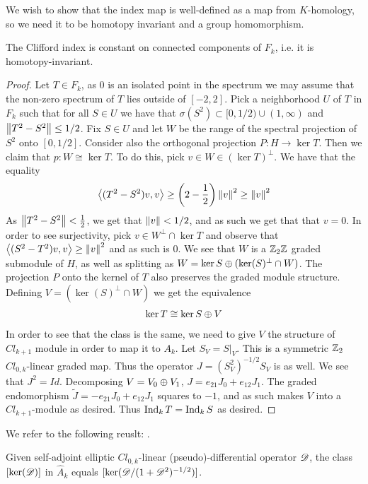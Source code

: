 We wish to show that the index map is well-defined as a map from $K$-homology, so we need it to be homotopy invariant and a group homomorphism. 
\begin{theorem}\label{welldef}
	The Clifford index is constant on connected components of $F_k$, i.e. it is homotopy-invariant. 
\end{theorem}
\begin{proof}
	Let $T\in F_k$, as $0$ is an isolated point in the spectrum we may assume that the non-zero spectrum of $T$ lies outside of $[-2,2]$. Pick a neighborhood $U$ of $T$ in $F_k$ such that for all $S\in U$ we have that $\sigma(S^2)\subset [0,1/2)\cup (1,\infty)$ and $\left \Vert T^2-S^2 \right \Vert\leq 1/2$. Fix $S\in U$ and let $W$ be the range of the spectral projection of $S^2$ onto $[0,1/2]$. 
	Consider also the orthogonal projection $P:H\to \ker T$. Then we claim that $p:W\cong \ker T$. To do this, pick $v\in W\in (\ker T)^\perp$. We have that the equality 
	\begin{align*}
		\left \langle (T^2-S^2)v,v \right \rangle\geq \left ( 2-\frac{1}{2} \right )\left \Vert v \right \Vert^2\geq \left \Vert v \right \Vert^2
	\end{align*}
	As $\left \Vert T^2-S^2 \right \Vert<\frac{1}{2}$, we get that $\left \Vert v \right \Vert<1/2$, and as such we get that that $v=0$. In order to see surjectivity, pick $v\in W^\perp \cap \ker T$ and observe that $\left \langle (S^2-T^2)v,v \right \rangle\geq \left \Vert v \right \Vert^2$ and as such is 0. 
	We see that $W$ is a $\mathbb{Z}_2\mathbb{Z}$ graded submodule of $H$, as well as splitting as $W=\ker S\oplus (\ker (S)^\perp \cap W)$. The projection $P$ onto the kernel of $T$ also preserves the graded module structure. Defining $V=(\ker (S)^\perp \cap W)$ we get the equivalence
	\begin{align*}
		\ker T\cong \ker S\oplus V
	\end{align*}
	In order to see that the class is the same, we need to give $V$ the structure of $Cl_{k+1}$ module in order to map it to $A_k$.
	Let $S_V=S|_V$. This is a symmetric $\mathbb{Z}_2$ $Cl_{0,k}$-linear graded map. Thus the operator $J=(S^2_V)^{-1/2}S_V$ is as well. We see that $J^2=Id$. Decomposing $V=V_0\oplus V_1$, $J=e_{21}J_0+e_{12}J_1$. The graded endomorphism $\tilde{J}=-e_{21}J_0+e_{12}J_1$ squares to $-1$, and as such makes $V$ into a $Cl_{k+1}$-module as desired. Thus $\operatorname{Ind}_k T=\operatorname{Ind}_k S$ as desired. 
\end{proof}
We refer to the following reuslt: \cite[Page 217]{spingeom}.
\begin{proposition}\label{unboundkernel}
	Given self-adjoint elliptic $Cl_{0,k}$-linear (pseudo)-differential operator $\mathscr{D}$, the class $[\ker(\mathscr{D})]$ in $\hat{A}_k$ equals $[\ker(\mathscr{D}/(1+\mathscr{D}^2)^{-1/2})]$.
\end{proposition}
